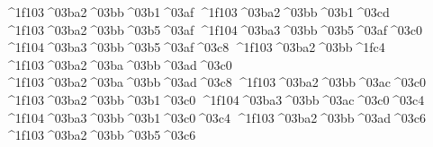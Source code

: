 {	^^^^1f103^^^^03ba2^^^^03bb^^^^03b1^^^^03af		%
	^^^^1f103^^^^03ba2^^^^03bb^^^^03b1^^^^03cd   		%
	^^^^1f103^^^^03ba2^^^^03bb^^^^03b5^^^^03af		%
		^^^^1f104^^^^03ba3^^^^03bb^^^^03b5^^^^03af^^^^03c0		%
		^^^^1f104^^^^03ba3^^^^03bb^^^^03b5^^^^03af^^^^03c8		%
	^^^^1f103^^^^03ba2^^^^03bb^^^^1fc4		%
	^^^^1f103^^^^03ba2^^^^03ba^^^^03bb^^^^03ad^^^^03c0		%
	^^^^1f103^^^^03ba2^^^^03ba^^^^03bb^^^^03ad^^^^03c8		%
	^^^^1f103^^^^03ba2^^^^03bb^^^^03ac^^^^03c0   		%
	^^^^1f103^^^^03ba2^^^^03bb^^^^03b1^^^^03c0		%
		^^^^1f104^^^^03ba3^^^^03bb^^^^03ac^^^^03c0^^^^03c4  		%
		^^^^1f104^^^^03ba3^^^^03bb^^^^03b1^^^^03c0^^^^03c4
	^^^^1f103^^^^03ba2^^^^03bb^^^^03ad^^^^03c6		%
	^^^^1f103^^^^03ba2^^^^03bb^^^^03b5^^^^03c6		%
}

